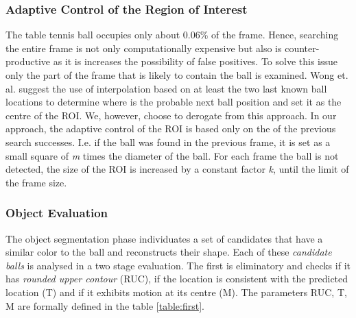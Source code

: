 \documentclass[a4paper]{article}
\begin{document}
\subsubsection{Adaptive Control of the Region of Interest}
The table tennis ball occupies only about 0.06\% of the frame. Hence, searching the entire frame is not only computationally expensive but also is counter-productive as it is increases the possibility of false positives. To solve this issue only the part of the frame that is likely to contain the ball is examined. Wong et. al.\cite{Wong} suggest the use of interpolation based on at least the two last known ball locations to determine where is the probable next ball position and set it as the centre of the ROI. We, however, choose to derogate from this approach. 
In our approach, the adaptive control of the ROI is based only on the of the previous search successes. I.e. if the ball was found in the previous frame, it is set as a small square of \textit{m} times the diameter of the ball. For each frame the ball is not detected, the size of the ROI is increased by a constant factor \textit{k}, until the limit of the frame size.

\subsubsection{Object Evaluation}
The object segmentation phase individuates a set of candidates that have a similar color to the ball and reconstructs their shape. Each of these \textit{candidate balls} is analysed in a two stage evaluation. The first is eliminatory and checks if it has \textit{rounded upper contour} (RUC), if the location is consistent with the predicted location (T) and if it exhibits motion at its centre (M). The parameters RUC, T, M are formally defined in the table \ref{table:first}.
\end{document}
